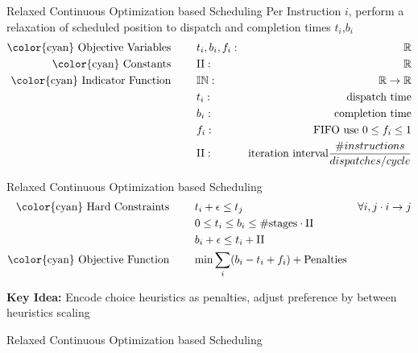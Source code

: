 \documentclass{beamer}
\begin{document}
\begin{darkframes}
    \begin{frame}{Relaxed Continuous Optimization based Scheduling}
      Per Instruction $i$, perform a relaxation of scheduled position to dispatch and completion times $t_i$,$b_i$
      \begin{align*}
        \text{\color{cyan} Objective Variables \qquad} & t_i, b_i, f_i:& \mathbb{R} \\
        \text{\color{cyan} Constants \qquad} & \textrm{II} :& \mathbb{R} \\
        \text{\color{cyan} Indicator Function \qquad} & \mathbb{IN} :& \mathbb{R} \rightarrow \mathbb{R} \\
                                                       & t_i :& \text{dispatch time} \\
                                                       & b_i :& \text{completion time} \\
                                                       & f_i :& \text{FIFO use } 0 \leq f_i \leq 1 \\
                                                       & \textrm{II} :& \text{iteration interval} \frac{\# instructions}{dispatches/cycle} \\
      \end{align*}
      
    \end{frame}

    \begin{frame}{Relaxed Continuous Optimization based Scheduling}
      \begin{align}
        \text{\color{cyan} Hard Constraints \qquad}  & t_i + \epsilon \leq t_j \qquad & \forall i,j \cdot i \rightarrow j \\
                                                     & 0 \leq t_i \leq b_i \leq \#\text{stages} \cdot \textrm{II}  & \\
                                                     & b_i + \epsilon \leq t_i + \textrm{II} \\
        \text{\color{cyan} Objective Function \qquad}   & \text{min} \sum_{i} (b_i - t_i + f_i) + \text{Penalties}
      \end{align}
      
      {\bf \color{green} Key Idea:} Encode choice heuristics as penalties, adjust preference by between heuristics scaling
    \end{frame}

    \begin{frame}{Relaxed Continuous Optimization based Scheduling}
      

\end{frame}
\end{darkframes}
\end{document}
